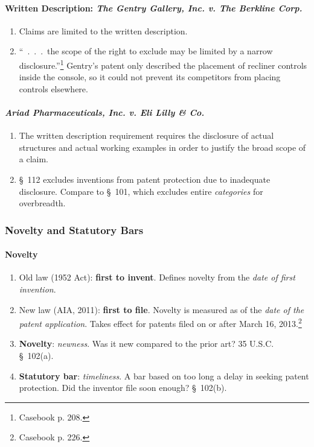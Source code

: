 \paragraph{Written Description: \emph{The Gentry Gallery, Inc. v. 
The Berkline Corp.}}

\begin{enumerate}
    \item Claims are limited to the written description.
    \item ``~.~.~.~the scope of the right to exclude may be limited by a 
    narrow disclosure.''\footnote{Casebook p. 208.} Gentry's patent only 
    described the placement of recliner controls inside the console, so it 
    could not prevent its competitors from placing controls elsewhere.
\end{enumerate}

\paragraph{\emph{Ariad Pharmaceuticals, Inc. v. Eli Lilly \& Co.}} %

\begin{enumerate}
    \item The written description requirement requires the disclosure of 
    actual structures and actual working examples in order to justify the 
    broad scope of a claim.
    \item \S\ 112 excludes inventions from patent protection due to inadequate 
    disclosure. Compare to \S\ 101, which excludes entire \emph{categories} 
    for overbreadth.
\end{enumerate}

\subsubsection{Novelty and Statutory Bars}

\paragraph{Novelty}

\begin{enumerate}
    \item Old law (1952 Act): \textbf{first to invent}. Defines novelty from 
    the \emph{date of first invention}.
    \item New law (AIA, 2011): \textbf{first to file}. Novelty is measured as 
    of the \emph{date of the patent application}. Takes effect for patents 
    filed on or after March 16, 2013.\footnote{Casebook p. 226.}
    \item \textbf{Novelty}: \emph{newness}. Was it new compared to the prior 
    art? 35 U.S.C. \S\ 102(a).
    \item \textbf{Statutory bar}: \emph{timeliness}. A bar based on too long a 
    delay in seeking patent protection. Did the inventor file soon enough? \S\ 
    102(b).
\end{enumerate}

